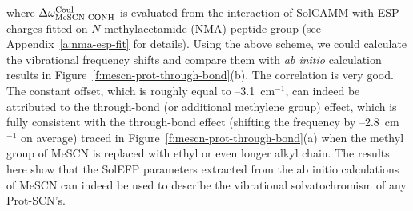 \documentclass[a4paper,titlepage,twoside,fleqn,12pt]{book}
\begin{document}
\begin{refsection}
\begin{equation}
\end{equation}
%
where $\Delta\omega_{\text{MeSCN-CONH}}^{\rm Coul}$
is evaluated from the interaction of
SolCAMM with ESP charges fitted on $N$-methylacetamide
(NMA) peptide group (see Appendix~\ref{a:nma-esp-fit} for details). Using the above
scheme, we could calculate the vibrational frequency shifts
and compare them with \emph{ab initio} calculation results in Figure~\ref{f:mescn-prot-through-bond}(b). 
The correlation is very good. The constant offset, which is
roughly equal to --3.1~cm$^{-1}$, can indeed be attributed to the
through\hyp{}bond (or additional methylene group) effect, which is
fully consistent with the through\hyp{}bond effect (shifting the
frequency by --2.8~cm$^{-1}$ on average) traced 
in Figure~\ref{f:mescn-prot-through-bond}(a) when
the methyl group of MeSCN is replaced with ethyl or even
longer alkyl chain. The results here show that the SolEFP
parameters extracted from the ab initio calculations of MeSCN
can indeed be used to describe the vibrational
solvatochromism of any Prot-SCN's.


\end{refsection}
\end{document}
